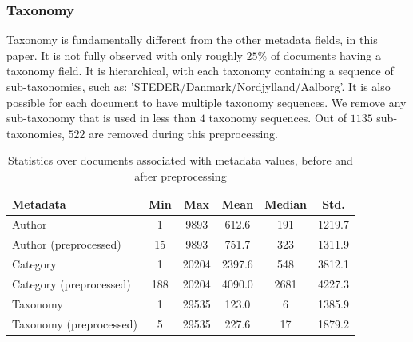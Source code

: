 \subsubsection{Taxonomy}\label{subsec:appendix_taxonomy}
Taxonomy is fundamentally different from the other metadata fields, in this paper.
It is not fully observed with only roughly $25\%$ of documents having a taxonomy field.
It is hierarchical, with each taxonomy containing a sequence of sub-taxonomies, such as: 'STEDER/Danmark/Nordjylland/Aalborg'.
It is also possible for each document to have multiple taxonomy sequences.
We remove any sub-taxonomy that is used in less than $4$ taxonomy sequences.
Out of $1135$ sub-taxonomies, $522$ are removed during this preprocessing.

\begin{table}
	\begin{tabular}{l | c | c | c | c | c}
		Metadata & Min & Max & Mean & Median & Std. \\
		\hline
		Author & 1 & 9893 & 612.6 & 191 & 1219.7 \\
		Author (preprocessed) & 15 & 9893 & 751.7 & 323 & 1311.9 \\
		Category & 1 & 20204 & 2397.6 & 548 & 3812.1 \\
		Category (preprocessed) & 188 & 20204 & 4090.0 & 2681 & 4227.3 \\
		Taxonomy & 1 & 29535 & 123.0 & 6 & 1385.9 \\
		Taxonomy (preprocessed) & 5 & 29535 & 227.6 & 17 & 1879.2 \\
	\end{tabular}
	\caption{Statistics over documents associated with metadata values, before and after preprocessing}
	\label{tab:meta_prepro_stats}
\end{table}
